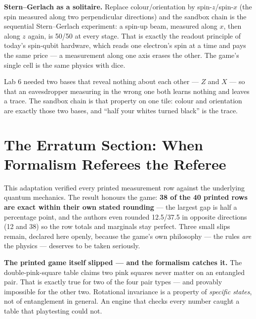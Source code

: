 \documentclass[a4paper,11pt]{article}
\begin{document}
\begin{industrybox}
\textbf{Stern--Gerlach as a solitaire.} Replace colour/orientation by spin-$z$/spin-$x$
(the spin measured along two perpendicular directions) and the sandbox chain is the sequential Stern--Gerlach experiment: a spin-up beam,
measured along $x$, then along $z$ again, is 50/50 at every stage. That is exactly the
readout principle of today's spin-qubit hardware, which reads one electron's spin at a
time and pays the same price --- a measurement along one axis erases the other. The
game's single cell is the same physics with dice.
\end{industrybox}

\begin{connectionbox}
Lab 6 needed two bases that reveal nothing about each other --- $Z$ and $X$ --- so that
an eavesdropper measuring in the wrong one both learns nothing and leaves a trace. The
sandbox chain is that property on one tile: colour and orientation are exactly those two
bases, and ``half your whites turned black'' is the trace.
\end{connectionbox}

\section{The Erratum Section: When Formalism Referees the Referee}
\label{sec:erratum}

This adaptation verified every printed measurement row against the underlying quantum
mechanics. The result honours the game: \textbf{38 of the 40 printed rows are exact
within their own stated rounding} --- the largest gap is half a percentage point, and the
authors even rounded 12.5/37.5 in opposite directions (12 and 38) so the row totals and
marginals stay perfect. Three small slips remain, declared here openly, because the
game's own philosophy --- the rules \emph{are} the physics --- deserves to be taken
seriously.

\begin{shockbox}
\textbf{The printed game itself slipped --- and the formalism catches it.} The
double-pink-square table claims two pink squares never matter on an entangled pair.
That is exactly true for two of the four pair types --- and provably impossible for the
other two. Rotational invariance is a property of \emph{specific states}, not of
entanglement in general. An engine that checks every number caught a table that
playtesting could not.
\end{shockbox}
\end{document}
